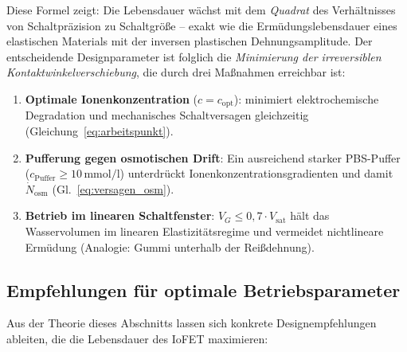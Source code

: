 ﻿\documentclass[a4paper,12pt]{scrreprt}
\theoremstyle{definition}
\begin{document}
Diese Formel zeigt: Die Lebensdauer wächst mit dem \emph{Quadrat} des
Verhältnisses von Schaltpräzision zu Schaltgröße -- exakt wie die
Ermüdungslebensdauer eines elastischen Materials mit der inversen plastischen
Dehnungsamplitude. Der entscheidende Designparameter ist folglich die
\emph{Minimierung der irreversiblen Kontaktwinkelverschiebung}, die durch
drei Maßnahmen erreichbar ist:

\begin{enumerate}
	\item \textbf{Optimale Ionenkonzentration} ($c = c_{\mathrm{opt}}$):
	minimiert elektrochemische Degradation und mechanisches Schaltversagen
	gleichzeitig (Gleichung~\eqref{eq:arbeitspunkt}).
	
	\item \textbf{Pufferung gegen osmotischen Drift}:
	Ein ausreichend starker PBS-Puffer ($c_{\mathrm{Puffer}} \geq 10\,\mathrm{mmol/l}$)
	unterdrückt Ionenkonzentrationsgradienten und damit
	$\dot{N}_{\mathrm{osm}}$ (Gl.~\eqref{eq:versagen_osm}).
	
	\item \textbf{Betrieb im linearen Schaltfenster}:
	$V_G \leq 0{,}7 \cdot V_{\mathrm{sat}}$ hält das Wasservolumen im
	linearen Elastizitätsregime und vermeidet nichtlineare Ermüdung
	(Analogie: Gummi unterhalb der Reißdehnung).
\end{enumerate}

\subsection{Empfehlungen für optimale Betriebsparameter}

Aus der Theorie dieses Abschnitts lassen sich konkrete Designempfehlungen
ableiten, die die Lebensdauer des IoFET maximieren:
\end{document}
